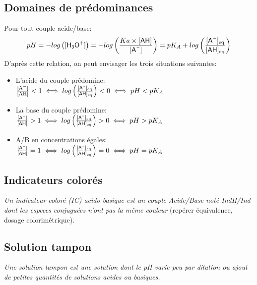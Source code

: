 \documentclass[a5paper,10pt]{article}
\begin{document}
\subsection{Domaines de prédominances}
Pour tout couple acide/base:
$$pH=-log\left([\text{\ce{H3O+}}]\right)=-log\left(\frac{Ka\times [\text{\ce{AH}}]}{[\text{\ce{A-}}]}\right)=pK_A+log\left(\frac{[\text{\ce{A-}}]_{\text{eq}}}{[\text{\ce{AH}}]_{\text{eq}}}\right)$$
D'après cette relation, on peut envisager les trois situations suivantes:
\begin{itemize}[noitemsep]
  \item L'\hspace*{1pt}acide du couple prédomine: $\frac{[\ce{A-}]}{[\ce{AH}]}<1 \iff log\left(\frac{[\text{\ce{A-}}]_{\text{eq}}}{[\text{\ce{AH}}]_{\text{eq}}}\right)<0 \iff pH<pK_A$
  \item La base du couple prédomine: $\frac{[\text{\ce{A-}}]}{[\text{\ce{AH}}]}>1 \iff log\left(\frac{[\text{\ce{A-}}]_{\text{eq}}}{[\text{\ce{AH}}]_{\text{eq}}}\right)>0 \iff pH>pK_A$
  \item A/B en concentrations égales: $\frac{[\text{\ce{A-}}]}{[\text{\ce{AH}}]}=1 \iff log\left(\frac{[\text{\ce{A-}}]_{\text{eq}}}{[\text{\ce{AH}}]_{\text{eq}}}\right)=0 \iff pH=pK_A$
\end{itemize}

\subsection{Indicateurs colorés}
\textit{Un indicateur coloré (IC) acido-basique est un couple Acide/Base noté IndH/Ind- dont les especes conjuguées n'ont pas la même couleur}
(repérer équivalence, dosage colorimétrique).

\subsection{Solution tampon}
\textit{Une solution tampon est une solution dont le pH varie peu par dilution ou ajout de petites quantités de solutions acides ou basiques.}
\end{document}
